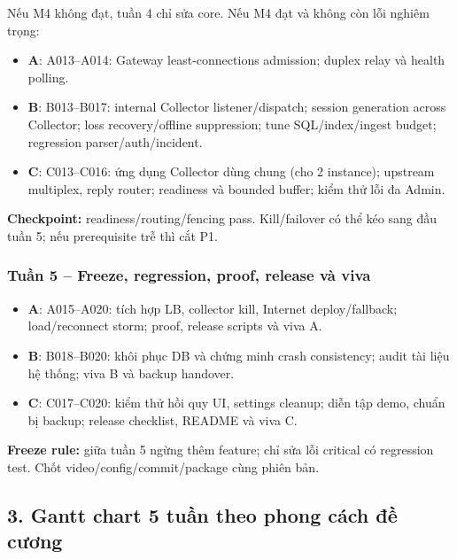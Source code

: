 Nếu M4 không đạt, tuần 4 chỉ sửa core. Nếu M4 đạt và không còn lỗi nghiêm trọng:
\begin{itemize}
    \item \textbf{A}: A013--A014: Gateway least-connections admission; duplex relay và health polling.
    \item \textbf{B}: B013--B017: internal Collector listener/dispatch; session generation across Collector; loss recovery/offline suppression; tune SQL/index/ingest budget; regression parser/auth/incident.
    \item \textbf{C}: C013--C016: ứng dụng Collector dùng chung (cho 2 instance); upstream multiplex, reply router; readiness và bounded buffer; kiểm thử lỗi đa Admin.
\end{itemize}

\textbf{Checkpoint:} readiness/routing/fencing pass. Kill/failover có thể kéo sang đầu tuần 5; nếu prerequisite trễ thì cắt P1.

\subsubsection*{Tuần 5 -- Freeze, regression, proof, release và viva}

\begin{itemize}
    \item \textbf{A}: A015--A020: tích hợp LB, collector kill, Internet deploy/fallback; load/reconnect storm; proof, release scripts và viva A.
    \item \textbf{B}: B018--B020: khôi phục DB và chứng minh crash consistency; audit tài liệu hệ thống; viva B và backup handover.
    \item \textbf{C}: C017--C020: kiểm thử hồi quy UI, settings cleanup; diễn tập demo, chuẩn bị backup; release checklist, README và viva C.
\end{itemize}

\textbf{Freeze rule:} giữa tuần 5 ngừng thêm feature; chỉ sửa lỗi critical có regression test. Chốt video/config/commit/package cùng phiên bản.

\subsection*{3. Gantt chart 5 tuần theo phong cách đề cương}

